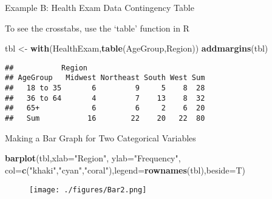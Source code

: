 \documentclass[12pt,ignorenonframetext,aspectratio=169]{beamer}
\newenvironment{Shaded}{\begin{snugshade}}{\end{snugshade}}
\newcommand{\KeywordTok}[1]{\textcolor[rgb]{0.13,0.29,0.53}{\textbf{{#1}}}}
\newcommand{\DataTypeTok}[1]{\textcolor[rgb]{0.13,0.29,0.53}{{#1}}}
\newcommand{\StringTok}[1]{\textcolor[rgb]{0.31,0.60,0.02}{{#1}}}
\newcommand{\NormalTok}[1]{{#1}}
\begin{document}
\begin{frame}[fragile]{Example B: Health Exam Data Contingency Table}

To see the crosstabs, use the `table' function in R

\begin{Shaded}
\begin{Highlighting}[]
\NormalTok{tbl <-}\StringTok{ }\KeywordTok{with}\NormalTok{(HealthExam,}\KeywordTok{table}\NormalTok{(AgeGroup,Region))}
\KeywordTok{addmargins}\NormalTok{(tbl)}
\end{Highlighting}
\end{Shaded}

\begin{verbatim}
##           Region
## AgeGroup   Midwest Northeast South West Sum
##   18 to 35       6         9     5    8  28
##   36 to 64       4         7    13    8  32
##   65+            6         6     2    6  20
##   Sum           16        22    20   22  80
\end{verbatim}


\end{frame}

\begin{frame}[fragile]{Making a Bar Graph for Two Categorical Variables}

\vspace{-.7em}

\begin{Shaded}
\begin{Highlighting}[]
\KeywordTok{barplot}\NormalTok{(tbl,}\DataTypeTok{xlab=}\StringTok{"Region"}\NormalTok{, }\DataTypeTok{ylab=}\StringTok{"Frequency"}\NormalTok{, }
        \DataTypeTok{col=}\KeywordTok{c}\NormalTok{(}\StringTok{"khaki"}\NormalTok{,}\StringTok{"cyan"}\NormalTok{,}\StringTok{"coral"}\NormalTok{),}\DataTypeTok{legend=}\KeywordTok{rownames}\NormalTok{(tbl),}\DataTypeTok{beside=}\NormalTok{T) }
\end{Highlighting}
\end{Shaded}

\vspace{-1.3em}

\begin{figure}[htbp]
\centering
\texttt{[image: ./figures/Bar2.png]}
\caption{}
\end{figure}


\end{frame}
\end{document}
